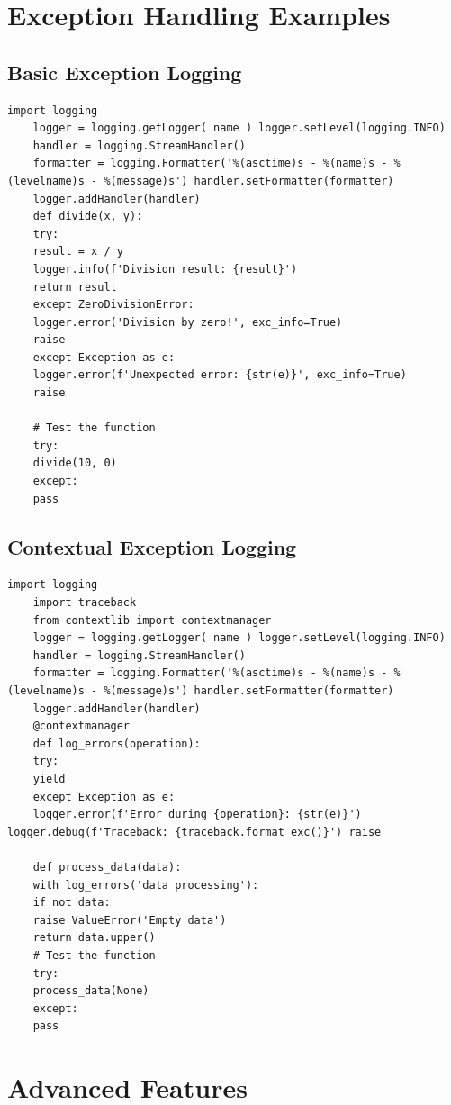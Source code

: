 \section{Exception Handling Examples}
\subsection{Basic Exception Logging}
\begin{lstlisting}[style=pythonstyle]
	import logging
	logger = logging.getLogger( name ) logger.setLevel(logging.INFO)
	handler = logging.StreamHandler()
	formatter = logging.Formatter('%(asctime)s - %(name)s - %(levelname)s - %(message)s') handler.setFormatter(formatter)
	logger.addHandler(handler)
	def divide(x, y):
	try:
	result = x / y
	logger.info(f'Division result: {result}')
	return result
	except ZeroDivisionError:
	logger.error('Division by zero!', exc_info=True)
	raise
	except Exception as e:
	logger.error(f'Unexpected error: {str(e)}', exc_info=True)
	raise
	
	# Test the function
	try:
	divide(10, 0)
	except:
	pass
\end{lstlisting}

\subsection{Contextual Exception Logging}
\begin{lstlisting}[style=pythonstyle]
	import logging
	import traceback
	from contextlib import contextmanager
	logger = logging.getLogger( name ) logger.setLevel(logging.INFO)
	handler = logging.StreamHandler()
	formatter = logging.Formatter('%(asctime)s - %(name)s - %(levelname)s - %(message)s') handler.setFormatter(formatter)
	logger.addHandler(handler)
	@contextmanager
	def log_errors(operation):
	try:
	yield
	except Exception as e:
	logger.error(f'Error during {operation}: {str(e)}') logger.debug(f'Traceback: {traceback.format_exc()}') raise
	
	def process_data(data):
	with log_errors('data processing'):
	if not data:
	raise ValueError('Empty data')
	return data.upper()
	# Test the function
	try:
	process_data(None)
	except:
	pass
\end{lstlisting}

\section{Advanced Features}

